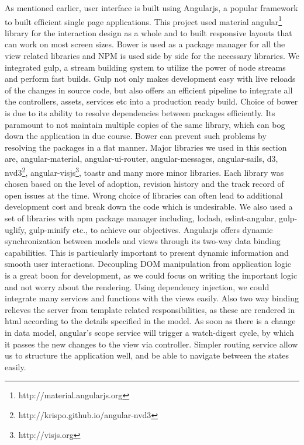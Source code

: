 \documentclass{seal_thesis}
\begin{document}
As mentioned earlier, user interface is built using Angularjs, a popular framework to built efficient single page applications. 
This project used material angular\footnote{http://material.angularjs.org} library for the interaction design as a whole and to built responsive layouts that can work on most screen sizes. 
Bower is used as a package manager for all the view related libraries and NPM is used side by side for the necessary libraries. 
We integrated gulp, a stream building system to utilize the power of node streams and perform fast builds. 
Gulp not only makes development easy with live reloads of the changes in source code, but also offers an efficient pipeline to integrate all the controllers, assets, services etc into a production ready build. 
Choice of bower is due to its ability to resolve dependencies between packages efficiently. Its paramount to not maintain multiple copies of the same library, which can bog down the application in due course. 
Bower can prevent such problems by resolving the packages in a flat manner. 
Major libraries we used in this section are, angular-material, angular-ui-router, angular-messages, angular-sails, d3, nvd3\footnote{http://krispo.github.io/angular-nvd3}, angular-visjs\footnote{http://visjs.org}, toastr and many more minor libraries. 
Each library was chosen based on the level of adoption, revision history and the track record of open issues at the time. 
Wrong choice of libraries can often lead to additional development cost and break down the code which is undesirable. 
We also used a set of libraries with npm package manager including, lodash, eslint-angular, gulp-uglify, gulp-minify etc., to achieve our objectives. 
Angularjs offers dynamic synchronization between models and views through its two-way data binding capabilities. 
This is particularly important to present dynamic information and smooth user interactions. 
Decoupling DOM manipulation from application logic is a great boon for development, as we could focus on writing the important logic and not worry about the rendering. 
Using dependency injection, we could integrate many services and functions with the views easily. 
Also two way binding relieves the server from template related responsibilities, as these are rendered in html according to the details specified in the model. 
As soon as there is a change in data model, angular's scope service will trigger a watch-digest cycle, by which it passes the new changes to the view via controller. 
Simpler routing service allow us to structure the application well, and be able to navigate between the states easily.
\end{document}
